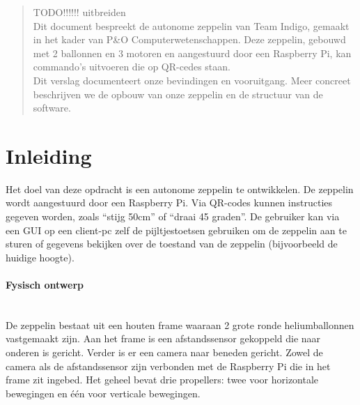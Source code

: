\documentclass[eind]{penoverslag}
\begin{document}
\maketitlepage


\begin{abstract}
\noindent
TODO!!!!!! uitbreiden\\
Dit document bespreekt de autonome zeppelin van Team Indigo, gemaakt in het kader van P\&O Computerwetenschappen. Deze zeppelin, gebouwd met 2 ballonnen en 3 motoren en aangestuurd door een Raspberry Pi, kan commando's uitvoeren die op QR-cedes staan.\\
Dit verslag documenteert onze bevindingen en vooruitgang. Meer concreet beschrijven we de opbouw van onze zeppelin en de structuur van de software.
\end{abstract}


\tableofcontents\newpage


\section{Inleiding}
Het doel van deze opdracht is een autonome zeppelin te ontwikkelen. De zeppelin wordt aangestuurd door een Raspberry Pi. Via QR-codes kunnen instructies gegeven worden, zoals ``stijg 50cm'' of ``draai 45   graden''. De gebruiker kan via een GUI op een client-pc zelf de pijltjestoetsen gebruiken om de zeppelin aan te sturen of gegevens bekijken over de toestand van de zeppelin (bijvoorbeeld de huidige hoogte).

\paragraph{Fysisch ontwerp}
~\\ 
De zeppelin bestaat uit een houten frame waaraan 2 grote ronde heliumballonnen vastgemaakt zijn. Aan het frame is een afstandssensor gekoppeld die naar onderen is gericht. Verder is er een camera naar beneden gericht. Zowel de camera als de afstandssensor zijn verbonden met de Raspberry Pi die in het frame zit ingebed. Het geheel bevat drie propellers: twee voor horizontale bewegingen en \'{e}\'{e}n voor verticale bewegingen.
\end{document}
